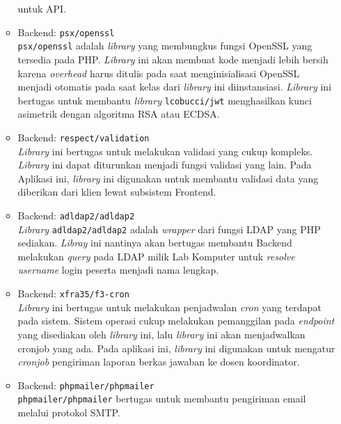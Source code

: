 \begin{itemize}
\begin{itemize}
                    untuk API.
                \item Backend: \texttt{psx/openssl} \\
                    \texttt{psx/openssl} adalah \textit{library} yang membungkus fungsi OpenSSL yang tersedia
                    pada PHP. \textit{Library} ini akan membuat kode menjadi lebih bersih karena \textit{overhead}
                    harus ditulis pada saat menginisialisasi OpenSSL menjadi otomatis pada saat kelas dari 
                    \textit{library} ini diinstansiasi.
                    \textit{Library} ini bertugas untuk membantu \textit{library} \texttt{lcobucci/jwt} menghasilkan kunci
                    asimetrik dengan algoritma RSA atau ECDSA. 
                \item Backend: \texttt{respect/validation} \\
                    \textit{Library} ini bertugas untuk melakukan validasi yang cukup kompleks. \textit{Library}
                    ini dapat diturunkan menjadi fungsi validasi yang lain. Pada Aplikasi ini, \textit{library} ini
                    digunakan untuk membantu validasi data yang diberikan dari klien lewat subsistem
                    Frontend.
                \item Backend: \texttt{adldap2/adldap2} \\
                    \textit{Library} \texttt{adldap2/adldap2} adalah \textit{wrapper} dari fungsi LDAP yang PHP sediakan.
                    \textit{Libray} ini nantinya akan bertugas membantu Backend melakukan \textit{query} 
                    pada LDAP milik Lab Komputer untuk \textit{resolve} \textit{username} login peserta
                    menjadi nama lengkap.
                \item Backend: \texttt{xfra35/f3-cron} \\
                    \textit{Library} ini bertugas untuk melakukan penjadwalan \textit{cron} yang terdapat
                    pada sistem. Sistem operasi cukup melakukan pemanggilan pada \textit{endpoint} yang disediakan
                    oleh \textit{library} ini, lalu \textit{library} ini akan menjadwalkan cronjob yang ada.
                    Pada aplikasi ini, \textit{library} ini digunakan untuk mengatur \textit{cronjob} pengiriman
                    laporan berkas jawaban ke dosen koordinator.
                \item Backend: \texttt{phpmailer/phpmailer} \\
                    \texttt{phpmailer/phpmailer} bertugas untuk membantu pengiriman email melalui protokol SMTP.

\end{itemize}
\end{itemize}
